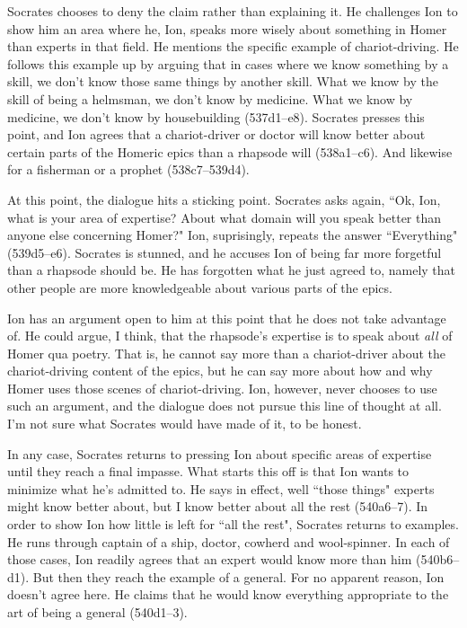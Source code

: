 \documentclass[11pt]{article}
\begin{document}
Socrates chooses to deny the claim rather than explaining it.  He
challenges Ion to show him an area where he, Ion, speaks more wisely about
something in Homer than experts in that field.  He mentions the specific
example of chariot-driving.  He follows this example up by arguing that in
cases where we know something by a skill, we don't know those same things
by another skill.  What we know by the skill of being a helmsman, we don't
know by medicine.  What we know by medicine, we don't know by housebuilding
(537d1--e8).  Socrates presses this point, and Ion agrees that
a chariot-driver or doctor will know better about certain parts of the
Homeric epics than a rhapsode will (538a1--c6).  And likewise for
a fisherman or a prophet (538c7--539d4).

At this point, the dialogue hits a sticking point.  Socrates asks again,
``Ok, Ion, what is your area of expertise?  About what domain will you
speak better than anyone else concerning Homer?"  Ion, suprisingly, repeats
the answer ``Everything" (539d5--e6).  Socrates is stunned, and he accuses
Ion of being far more forgetful than a rhapsode should be.  He has
forgotten what he just agreed to, namely that other people are more
knowledgeable about various parts of the epics.

Ion has an argument open to him at this point that he does not take
advantage of.  He could argue, I think, that the rhapsode's expertise is to
speak about \emph{all} of Homer qua poetry.  That is, he cannot say more
than a chariot-driver about the chariot-driving content of the epics, but
he can say more about how and why Homer uses those scenes of
chariot-driving.  Ion, however, never chooses to use such an argument, and
the dialogue does not pursue this line of thought at all.  I'm not sure
what Socrates would have made of it, to be honest.

In any case, Socrates returns to pressing Ion about specific areas of
expertise until they reach a final impasse.  What starts this off is that
Ion wants to minimize what he's admitted to.  He says in effect, well
``those things" experts might know better about, but I know better about
all the rest (540a6--7).  In order to show Ion how little is left for ``all
the rest", Socrates returns to examples.  He runs through captain of
a ship, doctor, cowherd and wool-spinner.  In each of those cases, Ion
readily agrees that an expert would know more than him (540b6--d1).  But
then they reach the example of a general.  For no apparent reason, Ion
doesn't agree here.  He claims that he would know everything appropriate to
the art of being a general (540d1--3).
\end{document}

